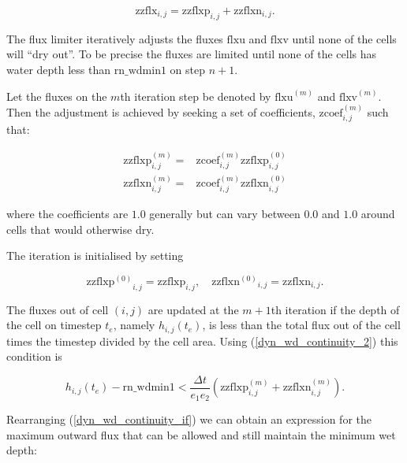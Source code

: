 \documentclass[../main/NEMO_manual]{subfiles}
\begin{document}
\begin{equation} \label{dyn_wd_zzflx_p_n_1}
\mathrm{zzflx}_{i,j} = \mathrm{zzflxp}_{i,j} + \mathrm{zzflxn}_{i,j} .  
\end{equation}

The flux limiter iteratively adjusts the fluxes $\mathrm{flxu}$ and $\mathrm{flxv}$ until
none of the cells will ``dry out''. To be precise the fluxes are limited until none of the
cells has water depth less than $\mathrm{rn\_wdmin1}$ on step $n+1$.

Let the fluxes on the $m$th iteration step be denoted by $\mathrm{flxu}^{(m)}$ and
$\mathrm{flxv}^{(m)}$.  Then the adjustment is achieved by seeking a set of coefficients,
$\mathrm{zcoef}_{i,j}^{(m)}$ such that:

\begin{equation} \label{dyn_wd_continuity_coef}
\begin{split}
\mathrm{zzflxp}^{(m)}_{i,j} =& \mathrm{zcoef}_{i,j}^{(m)} \mathrm{zzflxp}^{(0)}_{i,j} \\
\mathrm{zzflxn}^{(m)}_{i,j} =& \mathrm{zcoef}_{i,j}^{(m)} \mathrm{zzflxn}^{(0)}_{i,j}
\end{split}
\end{equation}

where the coefficients are $1.0$ generally but can vary between $0.0$ and $1.0$ around
cells that would otherwise dry.

The iteration is initialised by setting

\begin{equation} \label{dyn_wd_zzflx_initial}
\mathrm{zzflxp^{(0)}}_{i,j} = \mathrm{zzflxp}_{i,j} , \quad  \mathrm{zzflxn^{(0)}}_{i,j} = \mathrm{zzflxn}_{i,j} . 
\end{equation}

The fluxes out of cell $(i,j)$ are updated at the $m+1$th iteration if the depth of the
cell on timestep $t_e$, namely $h_{i,j}(t_e)$, is less than the total flux out of the cell
times the timestep divided by the cell area. Using (\ref{dyn_wd_continuity_2}) this
condition is

\begin{equation} \label{dyn_wd_continuity_if}
h_{i,j}(t_e)  - \mathrm{rn\_wdmin1} <  \frac{\Delta t}{e_1 e_2} ( \mathrm{zzflxp}^{(m)}_{i,j} + \mathrm{zzflxn}^{(m)}_{i,j} ) .
\end{equation}

Rearranging (\ref{dyn_wd_continuity_if}) we can obtain an expression for the maximum
outward flux that can be allowed and still maintain the minimum wet depth:
\end{document}
